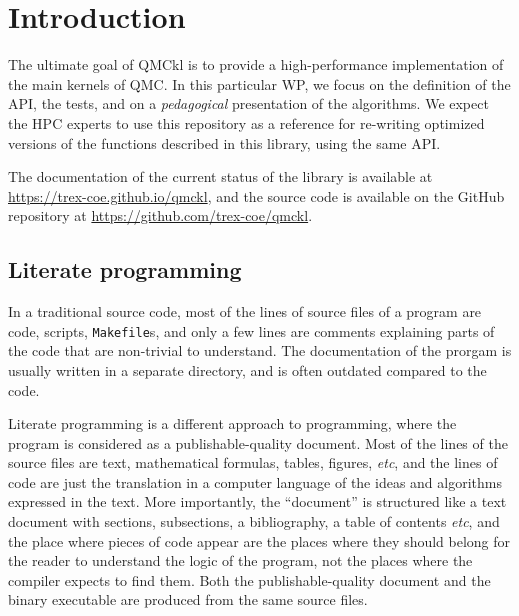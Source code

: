 \newcommand{\orgmode}{\texttt{org mode}}
\newcommand{\Makefile}{\texttt{Makefile}}
\newcommand{\context}{\texttt{context}}
\newcommand{\CC}{C\nolinebreak\hspace{-.05em}\raisebox{.4ex}{\tiny\bf +}\nolinebreak\hspace{-.10em}\raisebox{.4ex}{\tiny\bf +}}
\def\CC{{C\nolinebreak[4]\hspace{-.05em}\raisebox{.4ex}{\tiny\bf ++}}}

\section{Introduction}


The ultimate goal of \ac{QMCkl} is to provide a high-performance
implementation of the main kernels of \ac{QMC}. In this particular
\ac{WP}, we focus on the definition of the \ac{API}, the tests,
and on a \emph{pedagogical} presentation of the algorithms.  We expect
the \ac{HPC} experts to use this repository as a reference for re-writing
optimized versions of the functions described in this library, using
the same \ac{API}.

The documentation of the current status of the library is available
at \url{https://trex-coe.github.io/qmckl}, and the source code is
available on the GitHub repository at \url{https://github.com/trex-coe/qmckl}.


\subsection{Literate programming}

In a traditional source code, most of the lines of source files of a
program are code, scripts, {\Makefile}s, and only a few lines are
comments explaining parts of the code that are non-trivial to
understand. The documentation of the prorgam is usually written
in a separate directory, and is often outdated compared to the code.

Literate programming\cite{knuth_1992} is a different approach to
programming, where the program is considered as a publishable-quality
document. Most of the lines of the source files are text,
mathematical formulas, tables, figures, \textit{etc}, and the lines of
code are just the translation in a computer language of the ideas
and algorithms expressed in the text. More importantly, the ``document'' is
structured like a text document with sections, subsections, a bibliography,
a table of contents \textit{etc}, and the place where pieces of code
appear are the places where they should belong for the reader to
understand the logic of the program, not the places where the compiler
expects to find them. Both the publishable-quality document and the
binary executable are produced from the same source files. 

